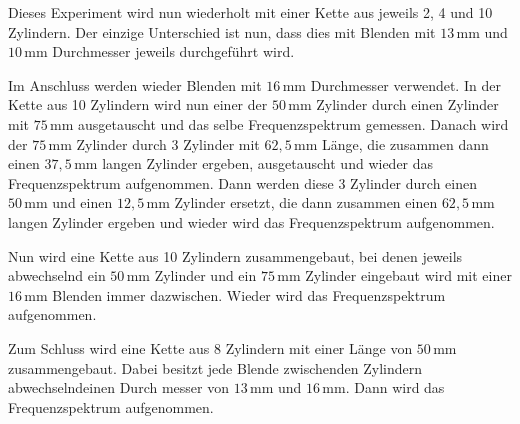 Dieses Experiment wird nun wiederholt mit einer Kette aus jeweils 2, 4 und 10 Zylindern. Der einzige Unterschied ist nun, dass dies mit Blenden mit $13 \, \mathrm{mm}$ und $10 \, \mathrm{mm}$ Durchmesser jeweils durchgeführt wird. \newline

Im Anschluss werden wieder Blenden mit $16 \, \mathrm{mm}$ Durchmesser verwendet. In der Kette aus 10 Zylindern wird nun einer der $50 \, \mathrm{mm}$ Zylinder durch einen Zylinder mit $75 \, \mathrm{mm}$ ausgetauscht und das selbe Frequenzspektrum gemessen. Danach wird der $75 \, \mathrm{mm}$ Zylinder durch 3 Zylinder mit $62, \! 5 \, \mathrm{mm}$ Länge, die zusammen dann einen $37, \! 5 \, \mathrm{mm}$ langen Zylinder ergeben, ausgetauscht und wieder das Frequenzspektrum aufgenommen. Dann werden diese 3 Zylinder durch einen $50 \, \mathrm{mm}$ und einen $12, \! 5 \, \mathrm{mm}$ Zylinder ersetzt, die dann zusammen einen $62, \! 5 \, \mathrm{mm}$ langen Zylinder ergeben und wieder wird das Frequenzspektrum aufgenommen. \newline

Nun wird eine Kette aus 10 Zylindern zusammengebaut, bei denen jeweils abwechselnd ein $50 \, \mathrm{mm}$ Zylinder und ein $75 \, \mathrm{mm}$ Zylinder eingebaut wird mit einer $16 \, \mathrm{mm}$ Blenden immer dazwischen. Wieder wird das Frequenzspektrum aufgenommen. \newline

Zum Schluss wird eine Kette aus 8 Zylindern mit einer Länge von $50 \, \mathrm{mm}$ zusammengebaut. Dabei besitzt jede Blende zwischenden Zylindern abwechselndeinen Durch messer von $13 \, \mathrm{mm}$ und $16 \, \mathrm{mm}$. Dann wird das Frequenzspektrum aufgenommen.
